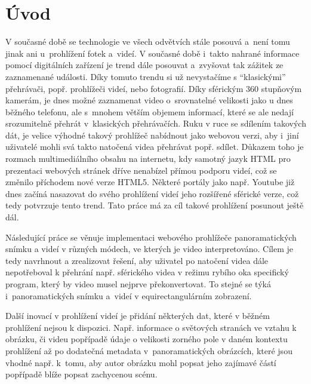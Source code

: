 \setcounter{secnumdepth}{4} %



\chapter{Úvod}
\label{chapter:1}

V současné době se technologie ve všech odvětvích stále posouvá a~není tomu jinak ani u~prohlížení fotek a~videí. V současné době i~takto nahrané informace pomocí digitálních zařízení je trend dále posouvat a~zvyšovat tak zážitek ze zaznamenané události. Díky tomuto trendu si už nevystačíme s ``klasickými''  přehrávači, popř. prohlížeči videí, nebo fotografií. Díky sférickým 360 stupňovým kamerám, je dnes možné zaznamenat video o~srovnatelné velikosti jako u dnes běžného telefonu, ale s~mnohem větším objemem informací, které se ale nedají srozumitelně přehrát v~klasických přehrávačích. Ruku v ruce se sdílením takových dát, je velice výhodné takový prohlížeč nabídnout jako webovou verzi, aby i~jiní uživatelé mohli svá takto natočená videa přehrávat popř. sdílet. Důkazem toho je rozmach multimediálního obsahu na internetu, kdy samotný jazyk HTML pro prezentaci webových stránek dříve nenabízel přímou podporu videí, což se změnilo příchodem nové verze HTML5. Některé portály jako např. Youtube již dnes začíná nasazovat do svého prohlížení videí jeho rozšířené sférické verze, což tedy potvrzuje tento trend. Tato práce má za cíl takové prohlížení posunout ještě dál.


Následující práce se věnuje implementaci webového prohlížeče panoramatických snímku a videí v různých módech, ve kterých je video interpretováno. Cílem je tedy navrhnout a zrealizovat řešení, aby uživatel po natočení videa dále nepotřeboval k přehrání např. sférického videa v režimu rybího oka specifický program, který by video musel nejprve překonvertovat. To stejné se týká i~panoramatických snímku a~videí v equirectangulárním zobrazení.  


Další inovací v prohlížení videí je přidání některých dat, které v běžném prohlížení nejsou k dispozici. Např. informace o světových stranách ve vztahu k obrázku, či videu popřípadě údaje o velikosti zorného pole v daném kontextu prohlížení až po dodatečná metadata v~panoramatických obrázcích, které jsou vhodné např. k~tomu, aby autor obrázku mohl popsat jeho zajímavé částí popřípadě blíže popsat zachycenou scénu.
\newline

